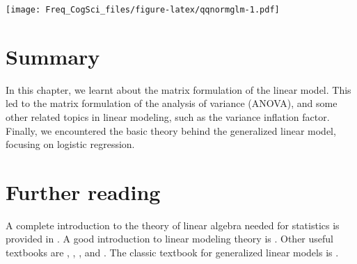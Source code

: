 \documentclass[
  12pt,
]{krantz}
\newenvironment{Shaded}{\begin{snugshade}}{\end{snugshade}}
\newcommand{\AttributeTok}[1]{\textcolor[rgb]{0.77,0.63,0.00}{#1}}
\newcommand{\DecValTok}[1]{\textcolor[rgb]{0.00,0.00,0.81}{#1}}
\newcommand{\FunctionTok}[1]{\textcolor[rgb]{0.00,0.00,0.00}{#1}}
\newcommand{\NormalTok}[1]{#1}
\newcommand{\OtherTok}[1]{\textcolor[rgb]{0.56,0.35,0.01}{#1}}
\newcommand{\SpecialCharTok}[1]{\textcolor[rgb]{0.00,0.00,0.00}{#1}}
\newcommand{\StringTok}[1]{\textcolor[rgb]{0.31,0.60,0.02}{#1}}
\theoremstyle{definition}
\theoremstyle{definition}
\theoremstyle{definition}
\theoremstyle{definition}
\theoremstyle{remark}
\begin{document}
\begin{Shaded}
\end{Shaded}

\texttt{[image: Freq\_CogSci\_files/figure-latex/qqnormglm-1.pdf]}

\hypertarget{summary-4}{%
\section{Summary}\label{summary-4}}

In this chapter, we learnt about the matrix formulation of the linear model. This led to the matrix formulation of the analysis of variance (ANOVA), and some other related topics in linear modeling, such as the variance inflation factor. Finally, we encountered the basic theory behind the generalized linear model, focusing on logistic regression.

\hypertarget{further-reading-3}{%
\section{Further reading}\label{further-reading-3}}

A complete introduction to the theory of linear algebra needed for statistics is provided in \citet{fieller}. A good introduction to linear modeling theory is \citet{fox1997applied}. Other useful textbooks are \citet{DraperSmith}, \citet{dobson2011introduction}, \citet{seber2012linear}, and \citet{monty}. The classic textbook for generalized linear models is \citet{mccullagh2019generalized}.
\end{document}
